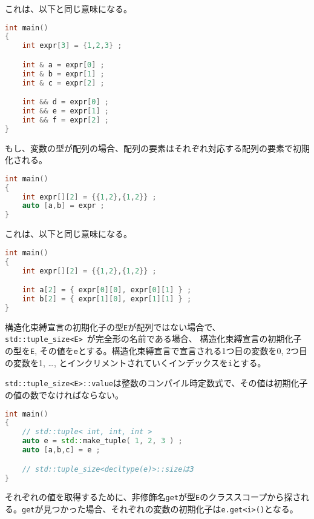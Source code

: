 これは、以下と同じ意味になる。

\begin{lstlisting}[language=C++]
int main()
{
    int expr[3] = {1,2,3} ;

    int & a = expr[0] ;
    int & b = expr[1] ;
    int & c = expr[2] ;

    int && d = expr[0] ;
    int && e = expr[1] ;
    int && f = expr[2] ;
}
\end{lstlisting}

もし、変数の型が配列の場合、配列の要素はそれぞれ対応する配列の要素で初期化される。

\begin{lstlisting}[language=C++]
int main()
{
    int expr[][2] = {{1,2},{1,2}} ;
    auto [a,b] = expr ;
}
\end{lstlisting}

これは、以下と同じ意味になる。

\begin{lstlisting}[language=C++]
int main()
{
    int expr[][2] = {{1,2},{1,2}} ;

    int a[2] = { expr[0][0], expr[0][1] } ;
    int b[2] = { expr[1][0], expr[1][1] } ;    
}
\end{lstlisting}

%

構造化束縛宣言の初期化子の型\lstinline!E!が配列ではない場合で、\lstinline!std::tuple_size<E>!~が完全形の名前である場合、
構造化束縛宣言の初期化子の型を\lstinline!E!,
その値を\lstinline!e!とする。構造化束縛宣言で宣言される1つ目の変数を0,
2つ目の変数を1, \ldots{},
とインクリメントされていくインデックスを\lstinline!i!とする。

\lstinline!std::tuple_size<E>::value!は整数のコンパイル時定数式で、その値は初期化子の値の数でなければならない。

\begin{lstlisting}[language=C++]
int main()
{
    // std::tuple< int, int, int >
    auto e = std::make_tuple( 1, 2, 3 ) ;
    auto [a,b,c] = e ;

    // std::tuple_size<decltype(e)>::sizeは3
}
\end{lstlisting}

それぞれの値を取得するために、非修飾名\lstinline!get!が型\lstinline!E!のクラススコープから探される。\lstinline!get!が見つかった場合、それぞれの変数の初期化子は\lstinline!e.get<i>()!となる。

